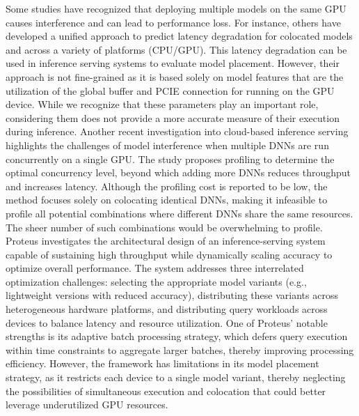 Some studies have recognized that deploying multiple models on the same GPU causes interference and can lead to performance loss. For instance, others have developed a unified approach to predict latency degradation for colocated models and across a variety of platforms (CPU/GPU). This latency degradation can be used in inference serving systems to evaluate model placement. However, their approach is not fine-grained as it is based solely on model features that are the utilization of the global buffer and PCIE connection for running on the GPU device. While we recognize that these parameters play an important role, considering them does not provide a more accurate measure of their execution during inference.
Another recent investigation into cloud-based inference serving highlights the challenges of model interference when multiple DNNs are run concurrently on a single GPU. The study proposes profiling to determine the optimal concurrency level, beyond which adding more DNNs reduces throughput and increases latency. Although the profiling cost is reported to be low, the method focuses solely on colocating identical DNNs, making it infeasible to profile all potential combinations where different DNNs share the same resources. The sheer number of such combinations would be overwhelming to profile. Proteus investigates the architectural design of an inference-serving system capable of sustaining high throughput while dynamically scaling accuracy to optimize overall performance. The system addresses three interrelated optimization challenges: selecting the appropriate model variants (e.g., lightweight versions with reduced accuracy), distributing these variants across heterogeneous hardware platforms, and distributing query workloads across devices to balance latency and resource utilization. One of Proteus' notable strengths is its adaptive batch processing strategy, which defers query execution within time constraints to aggregate larger batches, thereby improving processing efficiency. However, the framework has limitations in its model placement strategy, as it restricts each device to a single model variant, thereby neglecting the possibilities of simultaneous execution and colocation that could better leverage underutilized GPU resources.

